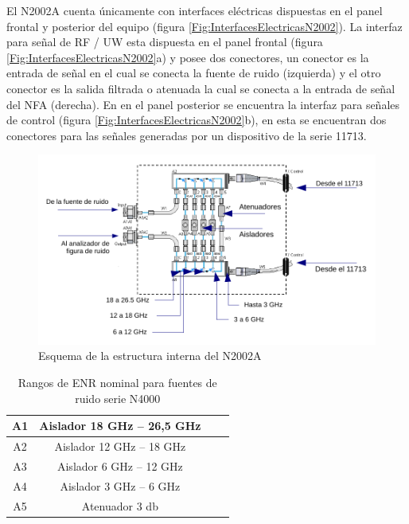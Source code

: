 El N2002A cuenta únicamente con interfaces eléctricas dispuestas en el panel frontal y posterior del equipo (figura \ref{Fig:InterfacesElectricasN2002}). La interfaz para señal de RF / UW esta dispuesta en el panel frontal (figura	\ref{Fig:InterfacesElectricasN2002}a) y posee dos conectores, un conector es la entrada de señal en el cual se conecta la fuente de	ruido (izquierda) y el otro conector es la salida filtrada o atenuada la cual se conecta a la entrada de señal del NFA (derecha). En en el panel posterior se encuentra la interfaz para señales de control (figura \ref{Fig:InterfacesElectricasN2002}b), en esta se encuentran dos conectores para las señales generadas por un dispositivo de la serie 11713.		

\begin{figure}[h!]
	\centering
	\includegraphics[width=15cm]{Imagenes/EsquemaEstructuraInternaN2002.pdf}
	\caption{Esquema de la estructura interna del N2002A}			
	\label{Fig:EsquemaEstructuraInternaN2002}
\end{figure}

\begin{table}[h!]
	\centering
	\begin{tabular}{cccc}
		\toprule
		A1 & Aislador 18 \si{\giga\hertz} – 26,5 \si{\giga\hertz} \\
		\midrule
		A2 & Aislador 12 \si{\giga\hertz} – 18 \si{\giga\hertz} \\
		\midrule
		A3 & Aislador 6 \si{\giga\hertz} – 12 \si{\giga\hertz} \\
		\midrule
		A4 & Aislador 3 \si{\giga\hertz} – 6 \si{\giga\hertz} \\		
		\midrule
		A5 & Atenuador 3 \si{\decibel} \\				
		\bottomrule
	\end{tabular}
	\caption{Rangos de ENR nominal para fuentes de ruido serie N4000}
	\label{Tab:RangosFuentesRuido}
\end{table}

